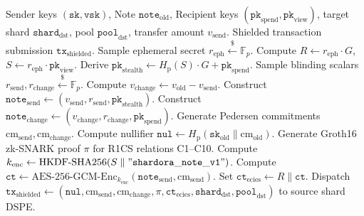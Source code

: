 \documentclass[journal,10pt,twocolumn]{IEEEtran}
\theoremstyle{definition}
\theoremstyle{remark}
\begin{document}
\begin{algorithm}[h]
\caption{Client Generation and Source Shard Submission}
\label{alg:source_dispatch}
\begin{algorithmic}[1]
\REQUIRE Sender keys $(\mathtt{sk}, \mathtt{vsk})$, Note $\mathtt{note}_{\text{old}}$, Recipient keys $(\mathtt{pk}_{\text{spend}}, \mathtt{pk}_{\text{view}})$, target shard $\mathtt{shard}_{\text{dst}}$, pool $\mathtt{pool}_{\text{dst}}$, transfer amount $v_{\text{send}}$.
\ENSURE Shielded transaction submission $\mathtt{tx}_{\text{shielded}}$.
\STATE Sample ephemeral secret $r_{\text{eph}} \xleftarrow{\$} \mathbb{F}_p$.
\STATE Compute $R \leftarrow r_{\text{eph}} \cdot G$, $S \leftarrow r_{\text{eph}} \cdot \mathtt{pk}_{\text{view}}$.
\STATE Derive $\mathtt{pk}_{\text{stealth}} \leftarrow H_{\text{p}}(S) \cdot G + \mathtt{pk}_{\text{spend}}$.
\STATE Sample blinding scalars $r_{\text{send}}, r_{\text{change}} \xleftarrow{\$} \mathbb{F}_p$.
\STATE Compute $v_{\text{change}} \leftarrow v_{\text{old}} - v_{\text{send}}$.
\STATE Construct $\mathtt{note}_{\text{send}} \leftarrow (v_{\text{send}}, r_{\text{send}}, \mathtt{pk}_{\text{stealth}})$.
\STATE Construct $\mathtt{note}_{\text{change}} \leftarrow (v_{\text{change}}, r_{\text{change}}, \mathtt{pk}_{\text{spend}})$.
\STATE Generate Pedersen commitments $\text{cm}_{\text{send}}, \text{cm}_{\text{change}}$.
\STATE Compute nullifier $\mathtt{nul} \leftarrow H_{\text{p}}(\mathtt{sk}_{\text{old}} \parallel \text{cm}_{\text{old}})$.
\STATE Generate Groth16 zk-SNARK proof $\pi$ for R1CS relations C1--C10.
\STATE Compute $k_{\text{enc}} \leftarrow \text{HKDF-SHA256}(S \parallel \mathtt{"shardora\_note\_v1"})$.
\STATE Compute $\mathtt{ct} \leftarrow \text{AES-256-GCM-Enc}_{k_{\text{enc}}}(\mathtt{note}_{\text{send}}, \text{cm}_{\text{send}})$.
\STATE Set $\mathtt{ct}_{\text{ecies}} \leftarrow R \parallel \mathtt{ct}$.
\STATE Dispatch $\mathtt{tx}_{\text{shielded}} \leftarrow (\mathtt{nul}, \text{cm}_{\text{send}}, \text{cm}_{\text{change}}, \pi, \mathtt{ct}_{\text{ecies}}, \mathtt{shard}_{\text{dst}}, \mathtt{pool}_{\text{dst}})$ to source shard DSPE.
\end{algorithmic}
\end{algorithm}
\end{document}
